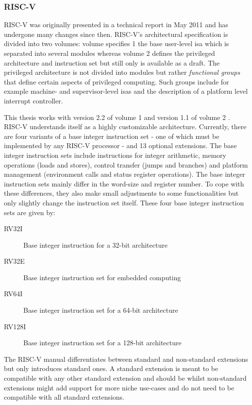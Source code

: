 \subsubsection{RISC-V}
\label{sec:bg-riscv}

RISC-V was originally presented in a technical report in May 2011 \cite{RiscVISA-org} and has undergone many changes since then.
RISC-V's architectural specification is divided into two volumes: volume specifies 1 the base user-level \gls{isa} which is separated into several modules whereas volume 2 defines the privileged architecture and instruction set but still only is available as a draft.
The privileged architecture is not divided into modules but rather \textit{functional groups} that define certain aspects of privileged computing.
Such groups include for example machine- and supervisor-level \glspl{isa} and the description of a platform level interrupt controller.


This thesis works with version 2.2 of volume 1 \cite{RiscVISA} and version 1.1 of volume 2 \cite{RiscVISAP}.
RISC-V understands itself as a highly customizable architecture.
Currently, there are four variants of a base integer instruction set - one of which must be implemented by any RISC-V processor - and 13 optional extensions.
The base integer instruction sets include instructions for integer arithmetic, memory operations (loads and stores), control transfer (jumps and branches) and platform management (environment calls and status register operations).
The base integer instruction sets mainly differ in the word-size and register number.
To cope with these differences, they also make small adjustments to some functionalities but only slightly change the instruction set itself.
These four base integer instruction sets are given by:
\begin{description}
    \item[RV32I] Base integer instruction  for a 32-bit architecture
    \item[RV32E] Base integer instruction set for embedded computing
    \item[RV64I] Base integer instruction set for a 64-bit architecture
    \item[RV128I] Base integer instruction set for a 128-bit architecture
\end{description}

The RISC-V manual differentiates between standard and non-standard extensions but only introduces standard ones.
A standard extension is meant to be compatible with any other standard extension and should be  whilst non-standard extensions might add support for more niche use-cases and do not need to be compatible with all standard extensions.

